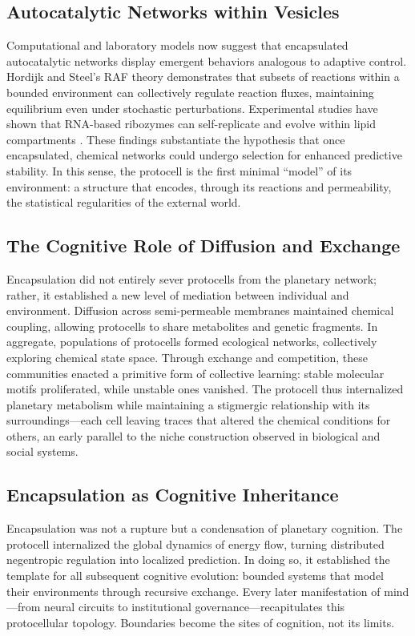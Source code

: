 \documentclass[11pt,a4paper]{article}
\begin{document}
\subsection{Autocatalytic Networks within Vesicles}

Computational and laboratory models now suggest that encapsulated autocatalytic networks display emergent behaviors analogous to adaptive control.  Hordijk and Steel’s RAF theory \citep{HordijkSteel2012RAF} demonstrates that subsets of reactions within a bounded environment can collectively regulate reaction fluxes, maintaining equilibrium even under stochastic perturbations.  Experimental studies have shown that RNA-based ribozymes can self-replicate and evolve within lipid compartments \citep{LincolnJoyce2009SelfSustainedReplication}.  These findings substantiate the hypothesis that once encapsulated, chemical networks could undergo selection for enhanced predictive stability.  In this sense, the protocell is the first minimal ``model'' of its environment: a structure that encodes, through its reactions and permeability, the statistical regularities of the external world.

\subsection{The Cognitive Role of Diffusion and Exchange}

Encapsulation did not entirely sever protocells from the planetary network; rather, it established a new level of mediation between individual and environment.  Diffusion across semi-permeable membranes maintained chemical coupling, allowing protocells to share metabolites and genetic fragments.  In aggregate, populations of protocells formed ecological networks, collectively exploring chemical state space.  Through exchange and competition, these communities enacted a primitive form of collective learning: stable molecular motifs proliferated, while unstable ones vanished.  The protocell thus internalized planetary metabolism while maintaining a stigmergic relationship with its surroundings—each cell leaving traces that altered the chemical conditions for others, an early parallel to the niche construction observed in biological and social systems.

\subsection{Encapsulation as Cognitive Inheritance}

Encapsulation was not a rupture but a condensation of planetary cognition.  The protocell internalized the global dynamics of energy flow, turning distributed negentropic regulation into localized prediction.  In doing so, it established the template for all subsequent cognitive evolution: bounded systems that model their environments through recursive exchange.  Every later manifestation of mind—from neural circuits to institutional governance—recapitulates this protocellular topology.  Boundaries become the sites of cognition, not its limits.  
\end{document}
